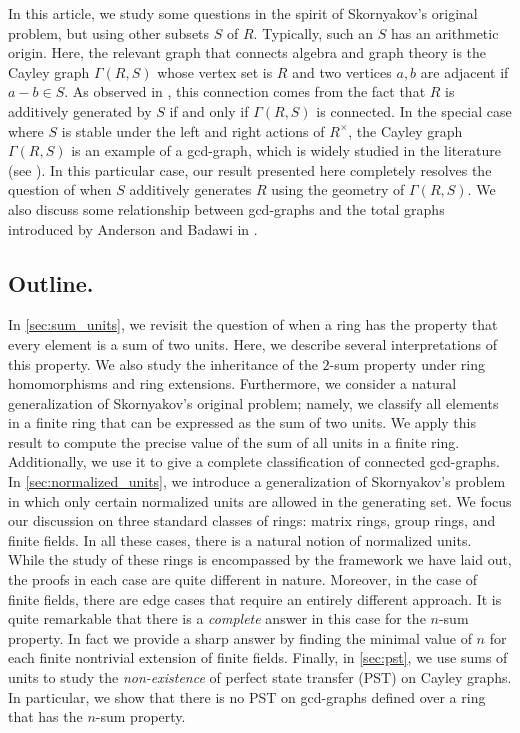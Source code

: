 \documentclass[11pt, a4paper]{amsart}
\theoremstyle{definition}
\numberwithin{equation}{section}
\begin{document}
In this article, we study some questions in the spirit of Skornyakov's original problem, but using other subsets $S$ of $R$. Typically, such an $S$ has an arithmetic origin. Here, the relevant graph that connects algebra and graph theory is the Cayley graph $\Gamma(R,S)$ whose vertex set is $R$ and two vertices $a,b$ are adjacent if $a-b \in S.$ As observed in \cite{maimani2010rings}, this connection comes from the fact that $R$ is additively generated by $S$ if and only if $\Gamma(R,S)$ is connected. In the special case where $S$ is stable under the left and right actions of $R^{\times}$, the Cayley graph $\Gamma(R,S)$ is an example of a gcd-graph, which is widely studied in the literature (see \cite{bavsic2009perfect, klotz2007some, nguyengcd2026, saxena2007parameters, pst-gcd-new}). In this particular case, our result presented here completely resolves the question of when $S$ additively generates $R$ using the geometry of $\Gamma(R,S)$. We also discuss some relationship between gcd-graphs and the total graphs introduced by Anderson and Badawi in \cite{anderson2008total}.








\subsection{Outline.}
In \cref{sec:sum_units}, we revisit the question of when a ring has the property that every element is a sum of two units. Here, we describe several interpretations of this property. We also study the inheritance of the $2$-sum property under ring homomorphisms and ring extensions. Furthermore, we consider a natural generalization of Skornyakov's original problem; namely, we classify all elements in a finite ring that can be expressed as the sum of two units. We apply this result to compute the precise value of the sum of all units in a finite ring. Additionally, we use it to give a complete classification of connected gcd-graphs. In \cref{sec:normalized_units}, we introduce a generalization of Skornyakov's problem in which only certain normalized units are allowed in the generating set. We focus our discussion on three standard classes of rings: matrix rings, group rings, and finite fields. In all these cases, there is a natural notion of normalized units. While the study of these rings is encompassed by the framework we have laid out, the proofs in each case are quite different in nature. Moreover, in the case of finite fields, there are edge cases that require an entirely different approach. It is quite remarkable that there is a \textit{complete} answer in this case for the $n$-sum property. In fact we provide a sharp answer by finding the minimal value of $n$ for each finite nontrivial extension of finite fields.
Finally, in \cref{sec:pst}, we use sums of units to study the \textit{non-existence} of perfect state transfer (PST) on Cayley graphs. In particular, we show that there is no PST on gcd-graphs defined over a ring that has the $n$-sum property.
\end{document}
